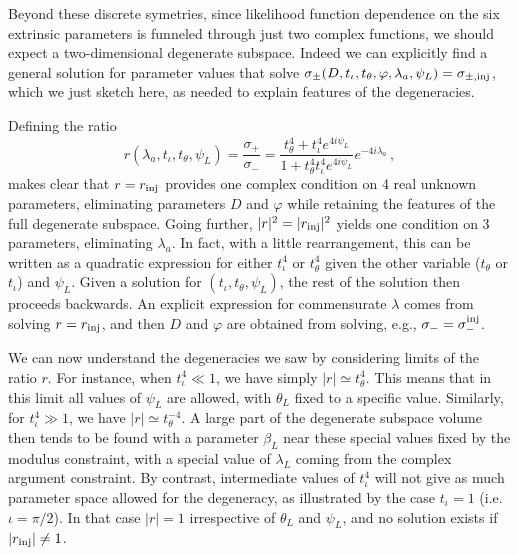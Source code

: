 \documentclass[aps,showpacs,twocolumn,prd,superscriptaddress,nofootinbib]{revtex4-1}
\newcommand{\be}{\begin{equation}}
\newcommand{\ee}{\end{equation}}
\newcommand\psiL{{\psi_{L}}}
\begin{document}
Beyond these discrete symetries, since likelihood function dependence on the six extrinsic parameters is funneled through just two complex functions, we should expect a two-dimensional degenerate subspace. Indeed we can explicitly find a general solution for parameter values that solve $\sigma_{\pm}(D, t_\iota, t_\theta, \varphi, \lambda_a, \psiL)=\sigma_{\pm,{\rm inj}}$, which we just sketch here, as needed to explain features of the degeneracies.

Defining the ratio
\be
	r(\lambda_a, t_\iota, t_\theta, \psiL) = \frac{\sigma_{+}}{\sigma_{-}} = \frac{t_{\theta}^{4}  + t_{\iota}^{4} e^{4 i \psiL}}{1+ t_{\theta}^{4} t_{\iota}^{4} e^{4 i \psiL}} e^{-4i \lambda_{a}}\,,
\ee
makes clear that $r=r_{\rm inj}$ provides one complex condition on 4 real unknown parameters, eliminating parameters $D$ and $\varphi$ while retaining the features of the full degenerate subspace.  Going further, $|r|^2=|r_{\rm inj}|^2$ yields one condition on 3 parameters, eliminating $\lambda_a$. In fact, with a little rearrangement, this can be written as a quadratic expression for either $t_\iota^4$ or $t_\theta^4$ given the other variable ($t_\theta$ or $t_\iota$) and $\psiL$. Given a solution for $(t_\iota,t_\theta,\psi_L)$, the rest of the solution then proceeds backwards. An explicit expression for commensurate $\lambda$ comes from solving $r=r_{\rm inj}$, and then $D$ and $\varphi$ are obtained from solving, e.g., $\sigma_-=\sigma_{-}^{\rm inj}$.

We can now understand the degeneracies we saw by considering limits of the ratio $r$. For instance, when $t_{\iota}^{4} \ll 1$, we have simply $|r| \simeq t_{\theta}^{4}$. This means that in this limit all values of $\psiL$ are allowed, with $\theta_{L}$ fixed to a specific value. Similarly, for $t_{\iota}^{4} \gg 1$, we have $|r| \simeq t_{\theta}^{-4}$. A large part of the degenerate subspace volume then tends to be found with a parameter $\beta_L$ near these special values fixed by the modulus constraint, with a special value of $\lambda_{L}$ coming from the complex argument constraint. By contrast, intermediate values of $t_{\iota}^{4}$ will not give as much parameter space allowed for the degeneracy, as illustrated by the case $t_{\iota} = 1$ (i.e. $\iota = \pi/2$). In that case $|r|=1$ irrespective of $\theta_{L}$ and $\psiL$, and no solution exists if $|r_{\rm inj}| \neq 1$.
\end{document}
